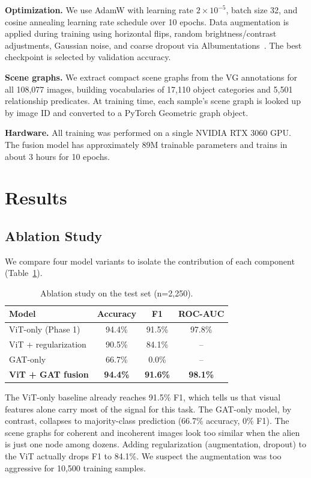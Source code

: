 \documentclass[conference]{IEEEtran}
\begin{document}
\textbf{Optimization.} We use AdamW with learning rate $2 \times 10^{-5}$, batch size 32, and cosine annealing learning rate schedule over 10 epochs. Data augmentation is applied during training using horizontal flips, random brightness/contrast adjustments, Gaussian noise, and coarse dropout via Albumentations~\cite{buslaev2020albumentations}. The best checkpoint is selected by validation accuracy.

\textbf{Scene graphs.} We extract compact scene graphs from the VG annotations for all 108,077 images, building vocabularies of 17,110 object categories and 5,501 relationship predicates. At training time, each sample's scene graph is looked up by image ID and converted to a PyTorch Geometric graph object.

\textbf{Hardware.} All training was performed on a single NVIDIA RTX 3060 GPU. The fusion model has approximately 89M trainable parameters and trains in about 3 hours for 10 epochs.

\section{Results}

\subsection{Ablation Study}

We compare four model variants to isolate the contribution of each component (Table~\ref{tab:ablation}).

\begin{table}[t]
\centering
\caption{Ablation study on the test set (n=2,250).}
\label{tab:ablation}
\begin{tabular}{@{}lccc@{}}
\toprule
\textbf{Model} & \textbf{Accuracy} & \textbf{F1} & \textbf{ROC-AUC} \\
\midrule
ViT-only (Phase 1) & 94.4\% & 91.5\% & 97.8\% \\
ViT + regularization & 90.5\% & 84.1\% & -- \\
GAT-only & 66.7\% & 0.0\% & -- \\
\textbf{ViT + GAT fusion} & \textbf{94.4\%} & \textbf{91.6\%} & \textbf{98.1\%} \\
\bottomrule
\end{tabular}
\end{table}

The ViT-only baseline already reaches 91.5\% F1, which tells us that visual features alone carry most of the signal for this task. The GAT-only model, by contrast, collapses to majority-class prediction (66.7\% accuracy, 0\% F1). The scene graphs for coherent and incoherent images look too similar when the alien is just one node among dozens. Adding regularization (augmentation, dropout) to the ViT actually drops F1 to 84.1\%. We suspect the augmentation was too aggressive for 10,500 training samples.
\end{document}
